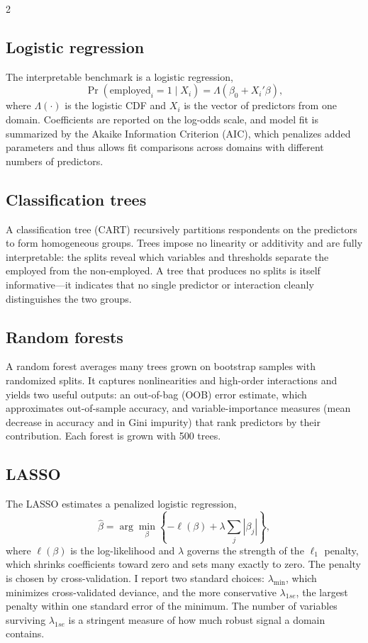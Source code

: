 \documentclass[
  11pt,
]{article}
\begin{document}
\begin{multicols}{2}
\subsection{Logistic regression}
The interpretable benchmark is a logistic regression,
\begin{equation}
\Pr(\text{employed}_i = 1 \mid X_i) = \Lambda\!\left(\beta_0 + X_i'\beta\right),
\end{equation}
where $\Lambda(\cdot)$ is the logistic CDF and $X_i$ is the vector of predictors from one domain. Coefficients are reported on the log-odds scale, and model fit is summarized by the Akaike Information Criterion (AIC), which penalizes added parameters and thus allows fit comparisons across domains with different numbers of predictors.

\subsection{Classification trees}
A classification tree (CART) recursively partitions respondents on the predictors to form homogeneous groups. Trees impose no linearity or additivity and are fully interpretable: the splits reveal which variables and thresholds separate the employed from the non-employed. A tree that produces no splits is itself informative---it indicates that no single predictor or interaction cleanly distinguishes the two groups.

\subsection{Random forests}
A random forest averages many trees grown on bootstrap samples with randomized splits. It captures nonlinearities and high-order interactions and yields two useful outputs: an out-of-bag (OOB) error estimate, which approximates out-of-sample accuracy, and variable-importance measures (mean decrease in accuracy and in Gini impurity) that rank predictors by their contribution. Each forest is grown with 500 trees.

\subsection{LASSO}
The LASSO estimates a penalized logistic regression,
\begin{equation}
\hat\beta = \arg\min_{\beta}\left\{-\ell(\beta) + \lambda \sum_{j} |\beta_j|\right\},
\end{equation}
where $\ell(\beta)$ is the log-likelihood and $\lambda$ governs the strength of the $\ell_1$ penalty, which shrinks coefficients toward zero and sets many exactly to zero. The penalty is chosen by cross-validation. I report two standard choices: $\lambda_{\min}$, which minimizes cross-validated deviance, and the more conservative $\lambda_{1se}$, the largest penalty within one standard error of the minimum. The number of variables surviving $\lambda_{1se}$ is a stringent measure of how much robust signal a domain contains.


\end{multicols}
\end{document}
